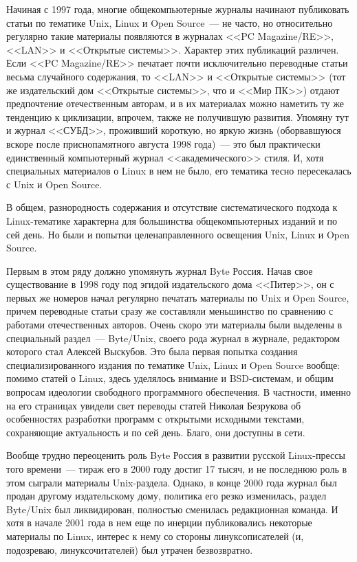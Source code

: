 Начиная с 1997 года, многие общекомпьютерные журналы начинают публиковать статьи по тематике Unix, Linux и Open Source~--- не часто, но относительно регулярно такие материалы появляются в журналах <<PC Magazine/RE>>, <<LAN>> и <<Открытые системы>>. Характер этих публикаций различен. Если <<PC Magazine/RE>> печатает почти исключительно переводные статьи весьма случайного содержания, то <<LAN>> и <<Открытые системы>> (тот же издательский дом <<Открытые системы>>, что и <<Мир ПК>>) отдают предпочтение отечественным авторам, и в их материалах можно наметить ту же тенденцию к циклизации, впрочем, также не получившую развития. Упомяну тут и журнал <<СУБД>>, проживший короткую, но яркую жизнь (оборвавшуюся вскоре после приснопамятного августа 1998 года)~--- это был практически единственный компьютерный журнал <<академического>> стиля. И, хотя специальных материалов о Linux в нем не было, его тематика тесно пересекалась с Unix и Open Source.

В общем, разнородность содержания и отсутствие систематического подхода к Linux-тематике характерна для большинства общекомпьютерных изданий и по сей день. Но были и попытки целенаправленного освещения Unix, Linux и Open Source.

Первым в этом ряду должно упомянуть журнал Byte Россия. Начав свое существование в 1998 году под эгидой издательского дома <<Питер>>, он с первых же номеров начал регулярно печатать материалы по Unix и Open Source, причем переводные статьи сразу же составляли меньшинство по сравнению с работами отечественных авторов. Очень скоро эти материалы были выделены в специальный раздел~--- Byte/Unix, своего рода журнал в журнале, редактором которого стал Алексей Выскубов. Это была первая попытка создания специализированного издания по тематике Unix, Linux и Open Source вообще: помимо статей о Linux, здесь уделялось внимание и BSD-системам, и общим вопросам идеологии свободного программного обеспечения. В частности, именно на его страницах увидели свет переводы статей Николая Безрукова об особенностях разработки программ с открытыми исходными текстами, сохраняющие актуальность и по сей день. Благо, они доступны в сети.

Вообще трудно переоценить роль Byte Россия в развитии русской Linux-прессы того времени~--- тираж его в 2000 году достиг 17 тысяч, и не последнюю роль в этом сыграли материалы Unix-раздела. Однако, в конце 2000 года журнал был продан другому издательскому дому, политика его резко изменилась, раздел Byte/Unix был ликвидирован, полностью сменилась редакционная команда. И хотя в начале 2001 года в нем еще по инерции публиковались некоторые материалы по Linux, интерес к нему со стороны линуксописателей (и, подозреваю, линуксочитателей) был утрачен безвозвратно.

